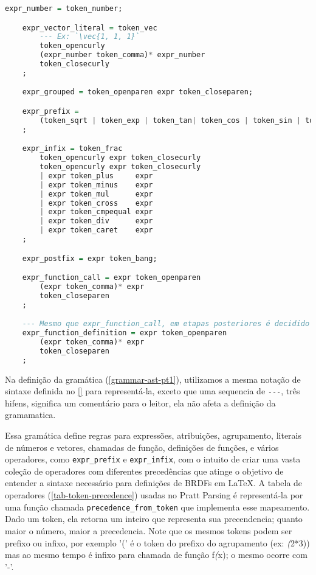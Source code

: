 \begin{codigo}[H]
        \caption{\small Gramática para \texttt{EquantionLang} parte 2.}
        \label{grammar-ast-pt2}
\begin{lstlisting}[language=haskell, numbers=none, inputencoding=utf8]
    expr_number = token_number;

    expr_vector_literal = token_vec
        --- Ex: `\vec{1, 1, 1}`
        token_opencurly
        (expr_number token_comma)* expr_number
        token_closecurly
    ;

    expr_grouped = token_openparen expr token_closeparen;

    expr_prefix =
        (token_sqrt | token_exp | token_tan| token_cos | token_sin | token_arctan | token_arccos | token_arcsin | token_minus | token_plus) expr
    ;

    expr_infix = token_frac
        token_opencurly expr token_closecurly
        token_opencurly expr token_closecurly
        | expr token_plus     expr
        | expr token_minus    expr
        | expr token_mul      expr
        | expr token_cross    expr
        | expr token_cmpequal expr
        | expr token_div      expr
        | expr token_caret    expr
    ;

    expr_postfix = expr token_bang;

    expr_function_call = expr token_openparen
        (expr token_comma)* expr
        token_closeparen
    ;

    --- Mesmo que expr_function_call, em etapas posteriores é decidido qual tipo realmente é.
    expr_function_definition = expr token_openparen
        (expr token_comma)* expr
        token_closeparen
    ;
\end{lstlisting}
\end{codigo}

Na definição da gramática (\autoref{grammar-ast-pt1}), utilizamos a mesma notação de sintaxe definida no \autoref{} para representá-la, exceto que uma sequencia de \verb"---", três hifens, significa um comentário para o leitor, ela não afeta a definição da gramamatica.

Essa gramática define regras para expressões, atribuições, agrupamento, literais de números e vetores, chamadas de função, definições de funções, e vários operadores, como \texttt{expr\_prefix} e \texttt{expr\_infix}, com o intuito de criar uma vasta coleção de operadores com diferentes precedências que atinge o objetivo de entender a sintaxe necessário para definições de BRDFs em \LaTeX{}. A tabela de operadores (\autoref{tab-token-precedence}) usadas no Pratt Parsing é representá-la por uma função chamada \texttt{precedence\_from\_token} que implementa esse mapeamento. Dado um token, ela retorna um inteiro que representa sua precendencia; quanto maior o número, maior a precedencia. Note que os mesmos tokens podem ser prefixo ou infixo, por exemplo '(' é o token do prefixo do agrupamento (ex: \emph{(}2*3)) mas ao mesmo tempo é infixo para chamada de função f\emph{(}x); o mesmo ocorre com '-'.

